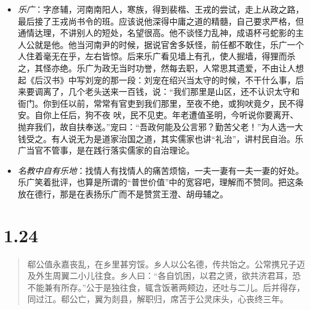 \documentclass[]{book}
\begin{document}
\begin{itemize}
\item
  \emph{乐广}：字彦辅，河南南阳人，寒族，得到裴楷、王戎的尝试，走上从政之路，最后接了王戎尚书令的班。应该说他深得中庸之道的精髓，自己要求严格，但通情达理，不讲别人的短处，名望很高。他不谈怪力乱神，成语杯弓蛇影的主人公就是他。他当河南尹的时候，据说官舍多妖怪，前任都不敢住，乐广一个人住着毫无在乎，左右皆惊。后来乐广看见墙上有孔，使人掘墙，得狸而杀之，其怪亦绝。乐广为政无当时功誉，然每去职，人常思其遗爱，不由让人想起《后汉书》中写刘宠的那一段：刘宠在绍兴当太守的时候，不干什么事，后来要调离了，几个老头送来一百钱，说：``我们那里是山区，还不认识太守和衙门。你到任以前，常常有官吏到我们那里，至夜不绝，或狗吠竟夕，民不得安。自你上任后，狗不夜
  吠，民不见吏。年老遭值圣明，今听说你要离开、抛弃我们，故自扶奉送。''宠曰：``吾政何能及公言邪？勤苦父老！''为人选一大钱受之。有人说无为是道家治国之道，其实儒家也讲``礼治''，讲村民自治。乐广当官不管事，是在践行落实儒家的自治理论。
\item
  \emph{名教中自有乐地}：找情人有找情人的痛苦烦恼，一夫一妻有一夫一妻的好处。乐广笑着批评，也算是所谓的``普世价值''中的宽容吧，理解而不赞同。把这条放在德行，那是在表扬乐广而不是赞赏王澄、胡毋辅之。
\end{itemize}

\section{1.24}\label{section-23}

\begin{quote}
郗公值永嘉丧乱，在乡里甚穷馁。乡人以公名德，传共饴之。公常携兄子迈及外生周翼二小儿往食。乡人曰：``各自饥困，以君之贤，欲共济君耳，恐不能兼有所存。''公于是独往食，辄含饭著两颊边，还吐与二儿。后并得存，同过江。郗公亡，翼为剡县，解职归，席苫于公灵床头，心丧终三年。
\end{quote}
\end{document}
